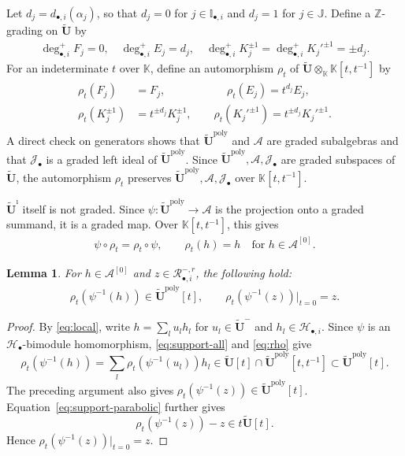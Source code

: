 \documentclass[a4paper,reqno,12pt]{amsart}
\numberwithin{equation}{section}
\newtheorem{lemma}[proposition]{Lemma}
\theoremstyle{definition}
\theoremstyle{plain}
\theoremstyle{definition}
\def\K{\mathbb K}
\def\Z{\mathbb Z}
\def\I{\mathbb I}
\def\J{\mathbb J}
\def\bIi{\I_{\bullet,i}}
\def\tU{\widetilde{\mathbf U}}
\def\tUi{\widetilde{\mathbf U}^{\imath}}
\def\cA{\mathcal A}
\def\cR{\mathcal R}
\def\cH{\mathcal H}
\def\cJ{\mathcal J}
\newcommand{\poly}{\mathrm{poly}}
\begin{document}
Let $d_j=d_{\bullet,i}(\alpha_j)$, so that $d_j=0$ for $j\in\bIi$ and $d_j=1$ for $j\in\J$. Define a $\Z$-grading on $\tU$ by
\begin{align}
    \deg_{\bullet,i}^+ F_j=0,\quad\deg_{\bullet,i}^+ E_j=d_j,\quad\deg_{\bullet,i}^+ K_j^{\pm1}=\deg_{\bullet,i}^+ K_j'^{\pm1}=\pm d_j.\label{eq:crucial-deg}
\end{align}
For an indeterminate $t$ over $\K$, define an automorphism $\rho_t$ of $\tU\otimes_\K\K[t,t^{-1}]$ by
\begin{align}
\begin{split}
\rho_t(F_j)&=F_j,\;\;\qquad\qquad\quad
\rho_t(E_j)=t^{d_j}E_j,\\
\rho_t(K_j^{\pm1})&=t^{\pm d_j}K_j^{\pm1},\qquad
\rho_t(K_j'^{\pm1})=t^{\pm d_j}K_j'^{\pm1}.
\label{eq:rho}
\end{split}
\end{align}
A direct check on generators shows that $\tU^\poly$ and $\cA$ are graded subalgebras and that $\cJ_\bullet$ is a graded left ideal of $\tU^\poly$. Since $\tU^\poly,\cA,\cJ_\bullet$ are graded subspaces of $\tU$, the automorphism $\rho_t$ preserves $\tU^\poly,\cA,\cJ_\bullet$ over $\K[t,t^{-1}]$.

$\tUi$ itself is not graded. Since $\psi:\tU^\poly\rightarrow \cA$ is the projection onto a graded summand, it is a graded map. Over $\K[t,t^{-1}]$, this gives
\begin{align}
\psi\circ\rho_t=\rho_t\circ\psi,\qquad
\rho_t(h)=h\quad\text{for $h\in\cA^{[0]}$}.
\label{eq:rho-psi}
\end{align}

\begin{lemma}
  For $h\in\cA^{[0]}$ and $z\in\cR_{\bullet,i}^{-,r}$, the following hold: 
\begin{align}
\rho_t(\psi^{-1}(h))\in\tU^\poly[t],\qquad
\rho_t(\psi^{-1}(z))|_{t=0}=z.
\label{eq:polynomial and constant-z}
\end{align}
\end{lemma}
\begin{proof}
 By \eqref{eq:local}, write $h=\sum_lu_lh_l$ for $u_l\in\tU^-$ and $h_l\in\cH_{\bullet,i}$. Since $\psi$ is an $\cH_\bullet$-bimodule homomorphism, \eqref{eq:support-all} and \eqref{eq:rho} give
 \begin{equation*}
  \rho_t(\psi^{-1}(h))=\sum_l\rho_t(\psi^{-1}(u_l))h_l\in\tU[t]\cap\tU^\poly[t,t^{-1}]\subset\tU^\poly[t].   
 \end{equation*}
 The preceding argument also gives $\rho_t(\psi^{-1}(z))\in\tU^\poly[t]$. Equation~\eqref{eq:support-parabolic} further gives
 \begin{equation*}
   \rho_t(\psi^{-1}(z))-z\in t\tU[t].  
 \end{equation*}
 Hence $\rho_t(\psi^{-1}(z))|_{t=0}=z$.
\end{proof}
\end{document}
